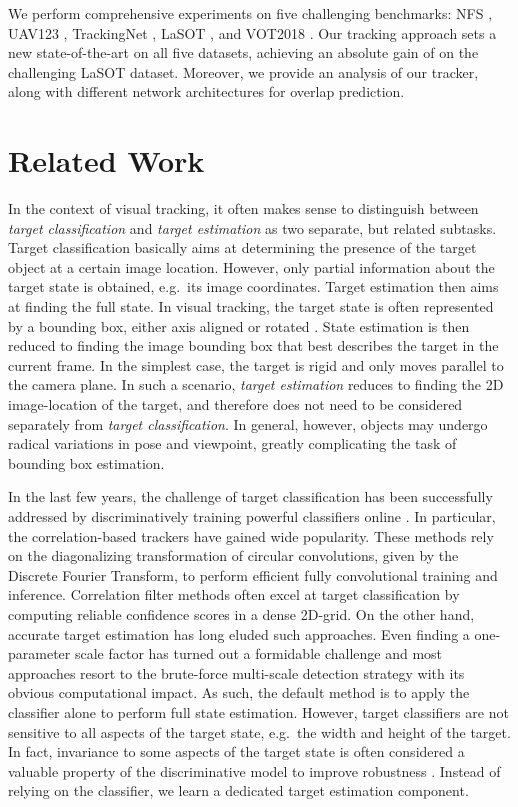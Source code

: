 \documentclass[10pt,twocolumn,letterpaper]{article}
\begin{document}
We perform comprehensive experiments on five challenging benchmarks: NFS \cite{NfS}, UAV123 \cite{UAV123}, TrackingNet \cite{TrackingNet}, LaSOT \cite{LaSOT}, and VOT2018 \cite{VOT2018}. Our tracking approach sets a new state-of-the-art on all five datasets, achieving an absolute gain of  on the challenging LaSOT dataset. Moreover, we provide an analysis of our tracker, along with different network architectures for overlap prediction.

 \section{Related Work}


In the context of visual tracking, it often makes sense to distinguish between \emph{target classification} and \emph{target estimation} as two separate, but related subtasks. Target classification basically aims at determining the presence of the target object at a certain image location. However, only partial information about the target state is obtained, e.g.\ its image coordinates. Target estimation then aims at finding the full state.
In visual tracking, the target state is often represented by a bounding box, either axis aligned \cite{NfS, OTB2015} or rotated \cite{VOT2018}. State estimation is then reduced to finding the image bounding box that best describes the target in the current frame. 
In the simplest case, the target is rigid and only moves parallel to the camera plane. In such a scenario, \emph{target estimation} reduces to finding the 2D image-location of the target, and therefore does not need to be considered separately from \emph{target classification}. In general, however, objects may undergo radical variations in pose and viewpoint, greatly complicating the task of bounding box estimation.

In the last few years, the challenge of target classification has been successfully addressed by discriminatively training powerful classifiers online \cite{DanelljanICCV2015,Henriques14,MDNet}. In particular, the correlation-based trackers \cite{DanelljanECCV2016,Henriques14,HCF_ICCV15} have gained wide popularity. 
These methods rely on the diagonalizing transformation of circular convolutions, given by the Discrete Fourier Transform, to perform efficient fully convolutional training and inference.
Correlation filter methods often excel at target classification by computing reliable confidence scores in a dense 2D-grid. On the other hand, accurate target estimation has long eluded such approaches. Even finding a one-parameter scale factor has turned out a formidable challenge \cite{danelljan2016discriminative,SAMF} and most approaches resort to the brute-force multi-scale detection strategy with its obvious computational impact. As such, the default method is to apply the classifier alone to perform full state estimation. However, target classifiers are not sensitive to all aspects of the target state, e.g.\ the width and height of the target. In fact, invariance to some aspects of the target state is often considered a valuable property of the discriminative model to improve robustness \cite{SiameseFC,BhatECCV2018,MDNet}. Instead of relying on the classifier, we learn a dedicated target estimation component.
\end{document}
